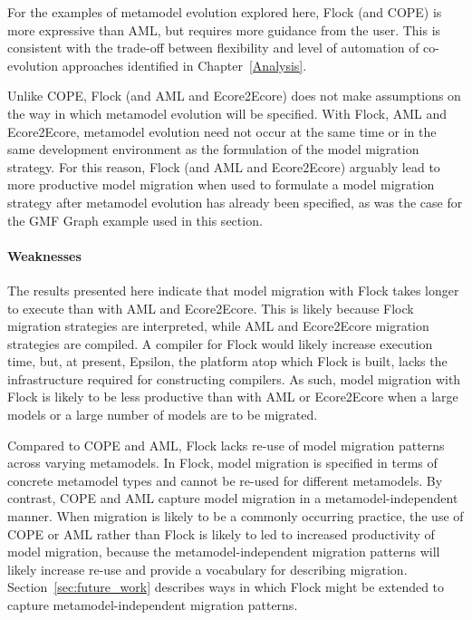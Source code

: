 For the examples of metamodel evolution explored here, Flock (and COPE) is more expressive than AML, but requires more guidance from the user. This is consistent with the trade-off between flexibility and level of automation of co-evolution approaches identified in Chapter~\ref{Analysis}.

Unlike COPE, Flock (and AML and Ecore2Ecore) does not make assumptions on the way in which metamodel evolution will be specified. With Flock, AML and Ecore2Ecore, metamodel evolution need not occur at the same time or in the same development environment as the formulation of the model migration strategy. For this reason, Flock (and AML and Ecore2Ecore) arguably lead to more productive model migration when used to formulate a model migration strategy after metamodel evolution has already been specified, as was the case for the GMF Graph example used in this section.

\paragraph{Weaknesses} The results presented here indicate that model migration with Flock takes longer to execute than with AML and Ecore2Ecore. This is likely because Flock migration strategies are interpreted, while AML and Ecore2Ecore migration strategies are compiled. A compiler for Flock would likely increase execution time, but, at present, Epsilon, the platform atop which Flock is built, lacks the infrastructure required for constructing compilers. As such, model migration with Flock is likely to be less productive than with AML or Ecore2Ecore when a large models or a large number of models are to be migrated.

Compared to COPE and AML, Flock lacks re-use of model migration patterns across varying metamodels. In Flock, model migration is specified in terms of concrete metamodel types and cannot be re-used for different metamodels. By contrast, COPE and AML capture model migration in a metamodel-independent manner. When migration is likely to be a commonly occurring practice, the use of COPE or AML rather than Flock is likely to led to increased productivity of model migration, because the metamodel-independent migration patterns will likely increase re-use and provide a vocabulary for describing migration. Section~\ref{sec:future_work} describes ways in which Flock might be extended to capture metamodel-independent migration patterns.

